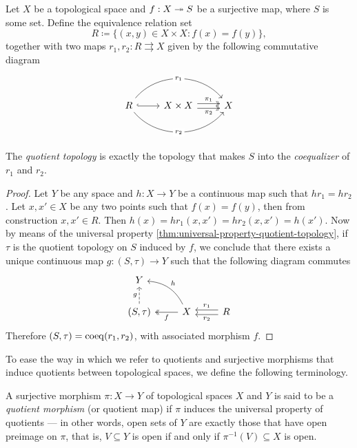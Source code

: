 \begin{proposition}
    \label{prop:quotient-top-as-coequalizer}
    Let \(X\) be a topological space and \(f: X \twoheadrightarrow S\) be a surjective
    map, where \(S\) is some set. Define the equivalence relation set
    \[
        R \coloneq \{(x, y) \in X \times X \colon f(x) = f(y)\},
    \]
    together with two maps \(r_1, r_2: R \rightrightarrows X\) given by the
    following commutative diagram
    \[
        \begin{tikzcd}
            R \ar[r, hook] \ar[rr, bend left=50, "r_1" description]
            \ar[rr, bend right=50, "r_2" description]
            &X \times X \ar[r, two heads, shift left, "\pi_1"]
            \ar[r, two heads, shift right, "\pi_2"']
            &X
        \end{tikzcd}
    \]

    The \emph{quotient topology} is exactly the topology that makes \(S\) into the
    \emph{coequalizer} of \(r_1\) and \(r_2\).
\end{proposition}

\begin{proof}
    Let \(Y\) be any space and \(h: X \to Y\) be a continuous map such that
    \(h r_1 = h r_2\). Let \(x, x' \in X\) be any two points such that
    \(f(x) = f(y)\), then from construction \(x, x' \in R\). Then
    \(h(x) = h r_1(x, x') = h r_2(x, x') = h(x')\). Now by means of the universal
    property \cref{thm:universal-property-quotient-topology}, if \(\tau\) is the
    quotient topology on \(S\) induced by \(f\), we conclude that there
    exists a unique continuous map \(g: (S, \tau) \to Y\) such that the following
    diagram commutes
    \[
        \begin{tikzcd}
            Y & & \\
            (S, \tau) \ar[u, dashed, "g"]
            &X \ar[l, two heads, "f"]
            \ar[lu, bend right, "h"']
            &R \ar[l, shift right, "r_1"'] \ar[l, shift left, "r_2"]
        \end{tikzcd}
    \]
    Therefore \((S, \tau) = \operatorname{coeq}(r_1, r_2)\), with associated morphism \(f\).
\end{proof}

To ease the way in which we refer to quotients and surjective morphisms that
induce quotients between topological spaces, we define the following
terminology.

\begin{definition}
    \label{def:quotient-morphism}
    A surjective morphism \(\pi: X \to Y\) of topological spaces \(X\) and \(Y\) is
    said to be a \emph{quotient morphism} (or quotient map) if \(\pi\) induces the
    universal property of quotients --- in other words, open sets of \(Y\) are
    exactly those that have open preimage on \(\pi\), that is, \(V \subseteq Y\) is
    open if and only if \(\pi^{-1}(V) \subseteq X\) is open.
\end{definition}


